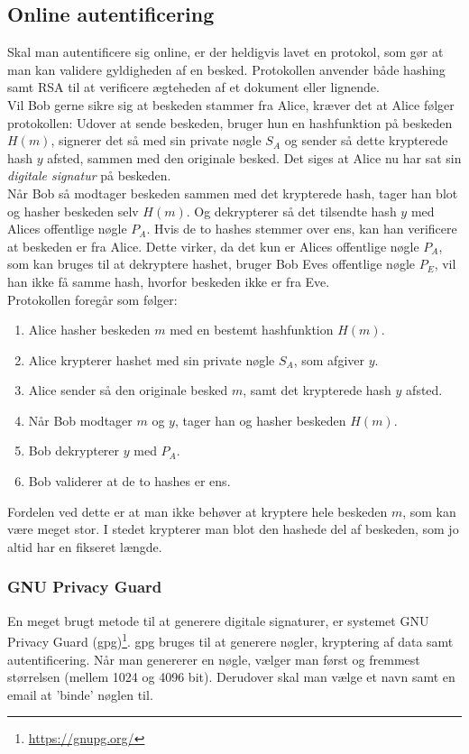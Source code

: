 \subsection{Online autentificering}\label{auth}
Skal man autentificere sig online, er der heldigvis lavet en protokol, som gør at man kan validere gyldigheden af en besked.\cite{dtu}
Protokollen anvender både hashing samt RSA til at verificere ægteheden af et dokument eller lignende.\\
Vil Bob gerne sikre sig at beskeden stammer fra Alice, kræver det at Alice følger protokollen:
Udover at sende beskeden, bruger hun en hashfunktion på beskeden \(H(m)\), signerer det så med sin private nøgle \(S_A\) og sender så dette krypterede hash \(y\) afsted, sammen med den originale besked.
Det siges at Alice nu har sat sin \emph{digitale signatur} på beskeden.\\
Når Bob så modtager beskeden sammen med det krypterede hash, tager han blot og hasher beskeden selv \(H(m)\).
Og dekrypterer så det tilsendte hash \(y\) med Alices offentlige nøgle \(P_A\).
Hvis de to hashes stemmer over ens, kan han verificere at beskeden er fra Alice.
Dette virker, da det kun er Alices offentlige nøgle \(P_A\), som kan bruges til at dekryptere hashet, bruger Bob Eves offentlige nøgle \(P_E\), vil han ikke få samme hash, hvorfor beskeden ikke er fra Eve.\\

Protokollen foregår som følger:
\begin{enumerate}%
    \item Alice hasher beskeden \(m\) med en bestemt hashfunktion \(H(m)\).
    \item Alice krypterer hashet med sin private nøgle \(S_A\), som afgiver \(y\).
    \item Alice sender så den originale besked \(m\), samt det krypterede hash \(y\) afsted.
    \item Når Bob modtager \(m\) og \(y\), tager han og hasher beskeden \(H(m)\).
    \item Bob dekrypterer \(y\) med \(P_A\).
    \item Bob validerer at de to hashes er ens.
\end{enumerate}

Fordelen ved dette er at man ikke behøver at kryptere hele beskeden \(m\), som kan være meget stor. I stedet krypterer man blot den hashede del af beskeden, som jo altid har en fikseret længde.


    \subsubsection{GNU Privacy Guard}
    En meget brugt metode til at generere digitale signaturer, er systemet GNU Privacy Guard (gpg)\footnote{\url{https://gnupg.org/}}.
    gpg bruges til at generere nøgler, kryptering af data samt autentificering.
    Når man genererer en nøgle, vælger man først og fremmest størrelsen (mellem 1024 og 4096 bit).
    Derudover skal man vælge et navn samt en email at 'binde' nøglen til.\\




